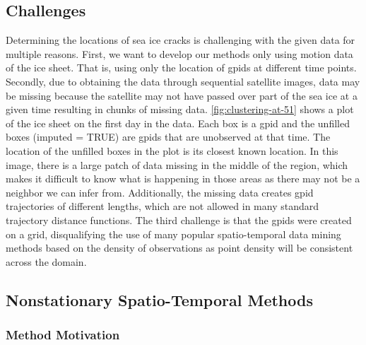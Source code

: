 \documentclass[12pt]{article}
\begin{document}
\hypertarget{challenges}{%
\subsection{Challenges}\label{challenges}}

Determining the locations of sea ice cracks is challenging with the
given data for multiple reasons. First, we want to develop our methods
only using motion data of the ice sheet. That is, using only the
location of gpids at different time points. Secondly, due to obtaining
the data through sequential satellite images, data may be missing
because the satellite may not have passed over part of the sea ice at a
given time resulting in chunks of missing data.
\cref{fig:clustering-at-51} shows a plot of the ice sheet on the first
day in the data. Each box is a gpid and the unfilled boxes (imputed =
TRUE) are gpids that are unobserved at that time. The location of the
unfilled boxes in the plot is its closest known location. In this image,
there is a large patch of data missing in the middle of the region,
which makes it difficult to know what is happening in those areas as
there may not be a neighbor we can infer from. Additionally, the missing
data creates gpid trajectories of different lengths, which are not
allowed in many standard trajectory distance functions. The third
challenge is that the gpids were created on a grid, disqualifying the
use of many popular spatio-temporal data mining methods based on the
density of observations as point density will be consistent across the
domain.

\hypertarget{nonstationary-spatio-temporal-methods}{%
\subsection{Nonstationary Spatio-Temporal
Methods}\label{nonstationary-spatio-temporal-methods}}

\hypertarget{method-motivation}{%
\subsubsection{Method Motivation}\label{method-motivation}}
\end{document}
